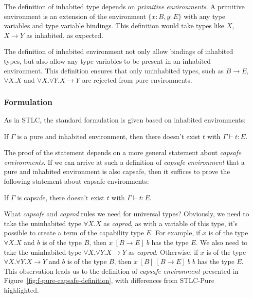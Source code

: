 The definition of inhabited type depends on \emph{primitive
  environments}. A primitive environment is an extension of the
environment $\{x:B, y:E\}$ with any type variables and type variable
bindings. This definition would take types like $X$, $X \to Y$ as
inhabited, as expected.

The definition of inhabited environment not only allow bindings of
inhabited types, but also allow any type variables to be present in an
inhabited environment. This definition ensures that only uninhabited
types, such as $B \to E$, $\forall X.X$ and
$\forall X.\forall Y.X \to Y$ are rejected from pure environments.

\subsubsection{Formulation}

As in STLC, the standard formulation is given based on inhabited
environments:

\begin{definition}
  If $\Gamma$ is a pure and inhabited environment, then there doesn't
  exist $t$ with $\Gamma \vdash t : E$.
\end{definition}

The proof of the statement depends on a more general statement about
\emph{capsafe environments}. If we can arrive at such a definition of
\emph{capsafe environment} that a pure and inhabited environment is
also capsafe, then it suffices to prove the following statement about
capsafe environments:

\begin{definition}
  If $\Gamma$ is capsafe, there doesn't exist $t$ with
  $\Gamma \vdash t : E$.
\end{definition}

What \emph{capsafe} and \emph{caprod} rules we need for universal
types? Obviously, we need to take the uninhabited type $\forall X.X$
as \emph{caprod}, as with a variable of this type, it's possible to
create a term of the capability type $E$. For example, if $x$ is of
the type $\forall X.X$ and $b$ is of the type $B$, then
$x \; [B \to E] \; b$ has the type $E$.  We also need to take the
uninhabited type $\forall X. \forall Y. X \to Y$ as
\emph{caprod}. Otherwise, if $x$ is of the type
$\forall X. \forall Y. X \to Y$ and $b$ is of the type $B$, then
$x \; [B] \; [B \to E] \; b \; b$ has the type $E$. This observation
leads us to the definition of \emph{capsafe environment} presented in
Figure~\ref{fig:f-pure-capsafe-definition}, with differences from
STLC-Pure highlighted.

